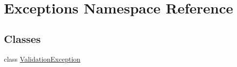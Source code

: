 \hypertarget{namespaceExceptions}{}\section{Exceptions Namespace Reference}
\label{namespaceExceptions}
\subsection*{Classes}
\begin{DoxyCompactItemize}
\item 
class \mbox{\hyperlink{classExceptions_1_1ValidationException}{Validation\+Exception}}
\end{DoxyCompactItemize}
